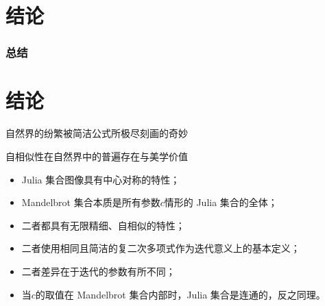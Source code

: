 \documentclass[8pt,c,compress,UTF8]{ctexbeamer}
\begin{document}
\section{结论}
\begin{frame} 
\frametitle{总结}
\section{结论}
\centering
自然界的纷繁被简洁公式所极尽刻画的奇妙

自相似性在自然界中的普遍存在与美学价值
\begin{itemize}
    \item Julia 集合图像具有中心对称的特性；
    \item Mandelbrot 集合本质是所有参数$c$情形的 Julia 集合的全体；
    \item 二者都具有无限精细、自相似的特性；
    \item 二者使用相同且简洁的复二次多项式作为迭代意义上的基本定义；
    \item 二者差异在于迭代的参数有所不同；
    \item 当$c$的取值在 Mandelbrot 集合内部时，Julia 集合是连通的，反之同理。
\end{itemize}
\end{frame}
\end{document}
